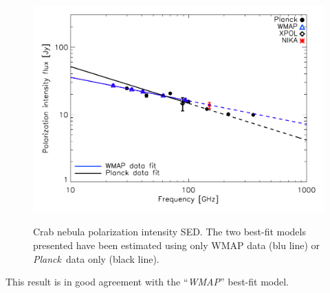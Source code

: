 \documentclass[twocolumn,traditabstract]{aa}
\def\NIKA{\textit{NIKA}}
\def\Planck{\textit{Planck}}
\def\WMAP{\textit{WMAP}}
\begin{document}
\begin{figure}
  \centering
             { \includegraphics[width=1\linewidth,keepaspectratio]{figures/Crab_SED_ipol.pdf}}
           \caption{Crab nebula polarization intensity SED. The two best-fit models presented have been estimated using only WMAP data (blu line) or \Planck\ data only (black line).}
\label{crab_SED_ipol}		
  \end{figure} 
 \noindent
This result is in good agreement with the ``\WMAP'' best-fit model.


\end{document}

